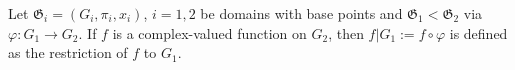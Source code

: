 Let $\mathfrak{G}_i = (G_i, \pi_i, x_i)$, $i = 1, 2$ be domains with base points and $\mathfrak{G}_1 < \mathfrak{G}_2$ via $\varphi: G_1 \to G_2$. If $f$ is a complex-valued function on $G_2$, then $f|G_1 := f \circ \varphi$ is defined as the restriction of $f$ to $G_1$.
